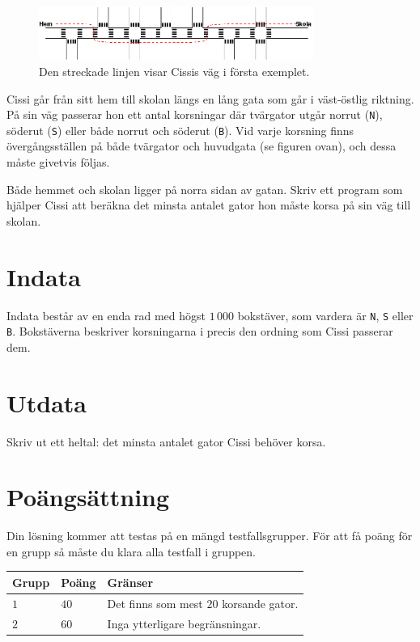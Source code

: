
\begin{figure}[!h]
\begin{center}
\includegraphics[width=0.8\textwidth]{skolvag.png}
\end{center}
\caption{Den streckade linjen visar Cissis väg i första exemplet.}
\end{figure}

\noindent
Cissi går från sitt hem till skolan längs en lång gata som går i väst-östlig riktning.
På sin väg passerar hon ett antal korsningar där tvärgator utgår norrut (\texttt{N}), söderut (\texttt{S}) eller både norrut och söderut (\texttt{B}).
Vid varje korsning finns övergångsställen på både tvärgator och huvudgata (se figuren ovan), och dessa måste givetvis följas.

Både hemmet och skolan ligger på norra sidan av gatan.
Skriv ett program som hjälper Cissi att beräkna det minsta antalet gator hon måste korsa på sin väg till skolan. 

\section*{Indata}
Indata består av en enda rad med högst $1\,000$ bokstäver, som vardera är {\tt N}, {\tt S} eller {\tt B}.
Bokstäverna beskriver korsningarna i precis den ordning som Cissi passerar dem.

\section*{Utdata}
Skriv ut ett heltal: det minsta antalet gator Cissi behöver korsa.

\section*{Poängsättning}
Din lösning kommer att testas på en mängd testfallsgrupper.
För att få poäng för en grupp så måste du klara alla testfall i gruppen.

\noindent
\begin{tabular}{| l | l | p{12cm} |}
  \hline
  \textbf{Grupp} & \textbf{Poäng} & \textbf{Gränser} \\ \hline
  $1$    & $40$        & Det finns som mest $20$ korsande gator. \\ \hline 
  $2$    & $60$        & Inga ytterligare begränsningar. \\ \hline 
\end{tabular}
